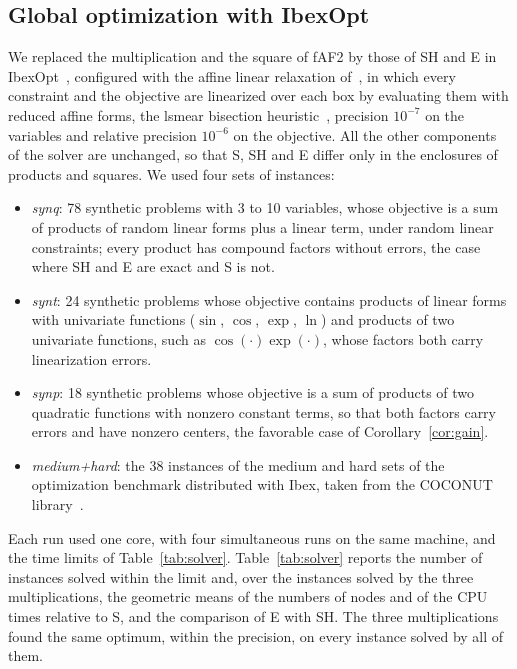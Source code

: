 \documentclass[10pt]{article}
\theoremstyle{definition}
\begin{document}
\subsection{Global optimization with IbexOpt}
\label{sec:solver}

We replaced the multiplication and the square of fAF2 by those of SH and E in IbexOpt~\cite{chabert2009}, configured with the affine linear relaxation of~\cite{ninin2015reliable}, in which every constraint and the objective are linearized over each box by evaluating them with reduced affine forms, the lsmear bisection heuristic~\cite{araya2017}, precision $10^{-7}$ on the variables and relative precision $10^{-6}$ on the objective. All the other components of the solver are unchanged, so that S, SH and E differ only in the enclosures of products and squares. We used four sets of instances:
\begin{itemize}
\item \emph{synq}: 78 synthetic problems with 3 to 10 variables, whose objective is a sum of products of random linear forms plus a linear term, under random linear constraints; every product has compound factors without errors, the case where SH and E are exact and S is not.
\item \emph{synt}: 24 synthetic problems whose objective contains products of linear forms with univariate functions ($\sin$, $\cos$, $\exp$, $\ln$) and products of two univariate functions, such as $\cos(\cdot)\exp(\cdot)$, whose factors both carry linearization errors.
\item \emph{synp}: 18 synthetic problems whose objective is a sum of products of two quadratic functions with nonzero constant terms, so that both factors carry errors and have nonzero centers, the favorable case of Corollary~\ref{cor:gain}.
\item \emph{medium+hard}: the 38 instances of the medium and hard sets of the optimization benchmark distributed with Ibex, taken from the COCONUT library~\cite{coconut}.
\end{itemize}
Each run used one core, with four simultaneous runs on the same machine, and the time limits of Table~\ref{tab:solver}. Table~\ref{tab:solver} reports the number of instances solved within the limit and, over the instances solved by the three multiplications, the geometric means of the numbers of nodes and of the CPU times relative to S, and the comparison of E with SH. The three multiplications found the same optimum, within the precision, on every instance solved by all of them.
\end{document}
